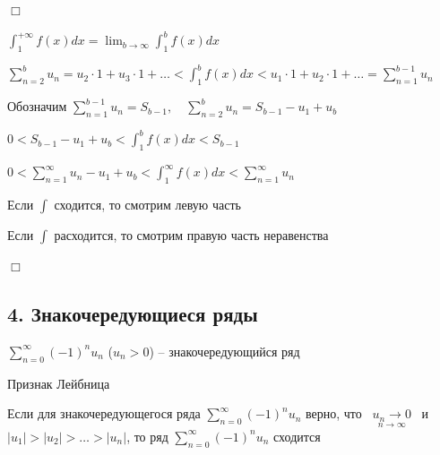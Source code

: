\documentclass[12pt]{article}
\begin{document}
    \begin{MyProof}
        $\Box$

        $\int_1^{+\infty} f(x) dx = \lim_{b \to \infty} \int_1^b f(x) dx$

        $\sum_{n = 2}^b u_n = u_2 \cdot 1 + u_3 \cdot 1 + \dots < \int_1^b f(x) dx < u_1 \cdot 1 + u_2 \cdot 1 + \dots = \sum_{n = 1}^{b - 1} u_n$

        Обозначим $\sum_{n = 1}^{b - 1} u_n = S_{b - 1}, \quad \sum_{n = 2}^{b} u_n = S_{b - 1} - u_1 + u_b$

        $0 < S_{b - 1} - u_1 + u_b < \int_1^b f(x) dx < S_{b - 1}$

        $0 < \sum_{n = 1}^{\infty} u_n - u_1 + u_b < \int_1^\infty f(x) dx < \sum_{n = 1}^\infty u_n$

        Если $\int$ сходится, то смотрим левую часть

        Если $\int$ расходится, то смотрим правую часть неравенства

        $\Box$
    \end{MyProof}

    \hypertarget{alternatingsignseries}{}

    \subsection{4. Знакочередующиеся ряды}

    \Def $\sum_{n = 0}^\infty (-1)^n u_n$ ($u_n > 0$) -- знакочередующийся ряд

    \hypertarget{leibniztheorem}{}

    \begin{MyTheorem}
        \Ths Признак Лейбница

        Если для знакочередующегося ряда $\sum_{n = 0}^\infty (-1)^n u_n$ верно,
        что \ $\underset{n \to \infty}{u_n \to 0}$ \ и \ $|u_1| > |u_2| > \dots > |u_n|$,
        то ряд $\sum_{n = 0}^\infty (-1)^n u_n$ сходится
    \end{MyTheorem}
\end{document}
